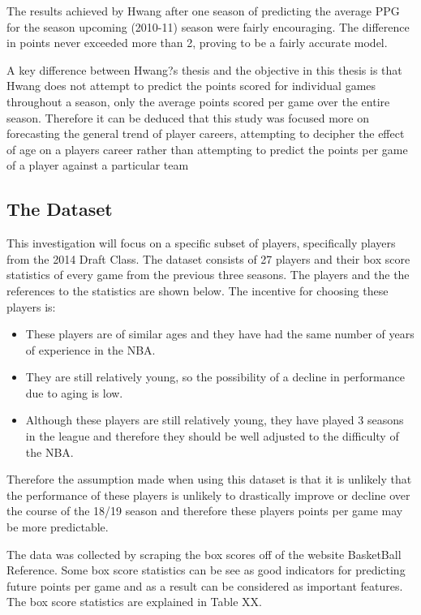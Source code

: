 \documentclass[a4paper,11pt,twoside]{article}
\begin{document}
The results achieved by Hwang after one season of predicting the average PPG for the season upcoming (2010-11) season were fairly encouraging. The difference in points never exceeded more than 2, proving to be a fairly accurate model.

A key difference between Hwang?s thesis and the objective in this thesis is that Hwang does not attempt to predict the points scored for individual games throughout a season, only the average points scored per game over the entire season. Therefore it can be deduced that this study was focused more on forecasting the general trend of player careers, attempting to decipher the effect of age on a players career rather than attempting to predict the points per game of a player against a particular team

\subsection{The Dataset}


This investigation will focus on a specific subset of players, specifically players from the 2014 Draft Class. The dataset consists of 27 players and their box score statistics of every game from the previous three seasons. The players and the the references to the statistics are shown below. The incentive for choosing these players is:
\begin{itemize}
    \item These players are of similar ages and they have had the same number of years of experience in the NBA.
    \item They are still relatively young, so the possibility of a decline in performance due to aging is low.
    \item Although these players are still relatively young, they have played 3 seasons in the league and therefore they should be well adjusted to the difficulty of the NBA.
\end{itemize}
Therefore the assumption made when using this dataset is that it is unlikely that the performance of these players is unlikely to drastically improve or decline over the course of the 18/19 season and therefore these players points per game may be more predictable.

The data was collected by scraping the box scores off of the website BasketBall Reference. Some box score statistics can be see as good indicators for predicting future points per game and as a result can be considered as important features. The box score statistics are explained in Table XX.
\end{document}

